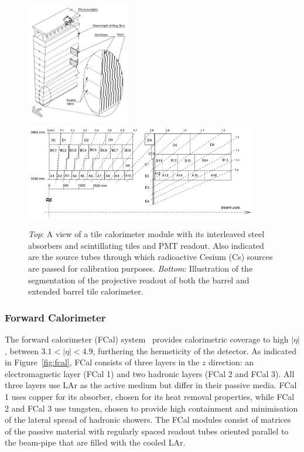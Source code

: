 \begin{figure}[!htb]
    \begin{center}
        \includegraphics[width=0.4\textwidth]{figures/chapter2/calorimeters/atlas_tile_module}
        \includegraphics[width=0.9\textwidth]{figures/chapter2/calorimeters/atlas_tile_plan_view}
        \caption{
            \textit{Top}: A view of a tile calorimeter module with its interleaved steel
                absorbers and scintillating tiles and PMT readout. Also indicated are the source tubes
                through which radioactive Cesium (Cs) sources are passed for calibration purposes.
            \textit{Bottom}: Illustration of the segmentation of the projective readout of
                both the barrel and extended barrel tile calorimeter.
        }
        \label{fig:tile_calo}
    \end{center}
\end{figure}

\FloatBarrier
\subsubsection{Forward Calorimeter}
\label{sec:calo_forward}

The forward calorimeter (FCal) system~\cite{Artamonov_2008} provides calorimetric coverage to
high $\lvert \eta \rvert$, between $3.1 < \lvert \eta \rvert < 4.9$,
furthering the hermeticity of the detector.
As indicated in Figure~\ref{fig:fcal}, FCal consists of three layers in the
$z$ direction: an electromagnetic layer (FCal 1) and two hadronic layers (FCal 2 and FCal 3).
All three layers use LAr as the active medium but differ in their passive media.
FCal 1 uses copper for its absorber, chosen for its heat removal properties,
while FCal 2 and FCal 3 use tungsten, chosen to provide high containment and
minimisation of the lateral spread of hadronic showers.
The FCal modules consist of matrices of the passive material with regularly
spaced readout tubes  oriented parallel to the beam-pipe that are filled with the cooled LAr.

